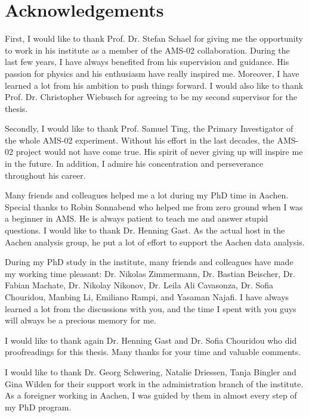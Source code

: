 
\chapter*{Acknowledgements}

First, I would like to thank Prof. Dr. Stefan Schael for giving me the opportunity to work in his institute as a member of the AMS-02 collaboration. During the last few years, I have always benefited from his supervision and guidance. His passion for physics and his enthusiasm have really inspired me. Moreover, I have learned a lot from his ambition to push things forward. I would also like to thank Prof. Dr. Christopher Wiebusch for agreeing to be my second supervisor for the thesis. \par

Secondly, I would like to thank Prof. Samuel Ting, the Primary Investigator of the whole AMS-02 experiment. Without his effort in the last decades, the AMS-02 project would not have come true. His spirit of never giving up will inspire me in the future. In addition, I admire his concentration and perseverance throughout his career.   \par

Many friends and colleagues helped me a lot during my PhD time in Aachen. Special thanks to Robin Sonnabend who helped me from zero ground when I was a beginner in AMS. He is always patient to teach me and answer stupid questions. I would like to thank Dr. Henning Gast. As the actual host in the Aachen analysis group, he put a lot of effort to support the Aachen data analysis. \par

During my PhD study in the institute, many friends and colleagues have made my working time pleasant: Dr. Nikolas Zimmermann, Dr. Bastian Beischer, Dr. Fabian Machate, Dr. Nikolay Nikonov, Dr. Leila Ali Cavasonza, Dr. Sofia Chouridou, Manbing Li, Emiliano Rampi, and Yasaman Najafi. I have always learned a lot from the discussions with you, and the time I spent with you guys will always be a precious memory for me. 

I would like to thank again Dr. Henning Gast and Dr. Sofia Chouridou who did proofreadings for this thesis. Many thanks for your time and valuable comments. \par  

I would like to thank Dr. Georg Schwering, Natalie Driessen, Tanja Bingler and Gina Wilden for their support work in the administration branch of the institute. As a foreigner working in Aachen, I was guided by them in almost every step of my PhD program.  \par

